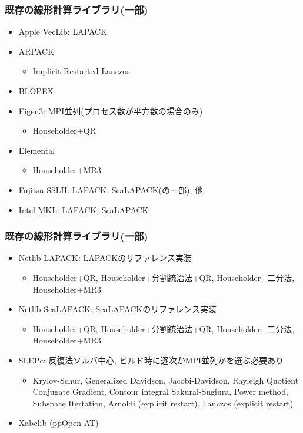 \begin{frame}
  \frametitle{既存の線形計算ライブラリ(一部)}
  \begin{itemize}
  \item Apple VecLib: LAPACK
  \item ARPACK
    \begin{itemize}
      \item Implicit Restarted Lanczos
    \end{itemize}
  \item BLOPEX
  \item Eigen3: MPI並列(プロセス数が平方数の場合のみ)
    \begin{itemize}
      \item Householder+QR
    \end{itemize}
  \item Elemental
    \begin{itemize}
      \item Householder+MR3
    \end{itemize}
  \item Fujitsu SSLII: LAPACK, ScaLAPACK(の一部), 他
  \item Intel MKL: LAPACK, ScaLAPACK
  \end{itemize}
\end{frame}

\begin{frame}
  \frametitle{既存の線形計算ライブラリ(一部)}
  \begin{itemize}
  \item Netlib LAPACK: LAPACKのリファレンス実装
    \begin{itemize}
      \item Householder+QR, Householder+分割統治法+QR, Householder+二分法, Householder+MR3
    \end{itemize}
  \item Netlib ScaLAPACK: ScaLAPACKのリファレンス実装
    \begin{itemize}
      \item Householder+QR, Householder+分割統治法+QR, Householder+二分法, Householder+MR3
    \end{itemize}
  \item SLEPc: 反復法ソルバ中心, ビルド時に逐次かMPI並列かを選ぶ必要あり
    \begin{itemize}
      \item Krylov-Schur, Generalized Davidson, Jacobi-Davidson, Rayleigh Quotient Conjugate Gradient, Contour integral Sakurai-Sugiura, Power method, Subspace Itertation, Arnoldi (explicit restart), Lanczos (explicit restart) \\
    \end{itemize}
  \item Xabclib (ppOpen AT)
  \end{itemize}
\end{frame}

